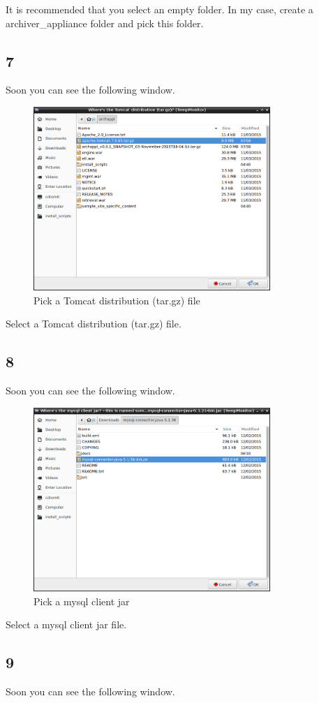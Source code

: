 \documentclass[11pt
  , a4paper
  , article
  , oneside
]{memoir}
\begin{document}
It is recommended that you select an empty folder. In my case, create a archiver\_appliance folder and pick this folder.\\
\subsection{7}
Soon you can see the following window.

\begin{figure}[h!]
	\centering
	\includegraphics[width=0.8\textwidth, height=0.4\textwidth]{./images/2.png}
	\caption{Pick a Tomcat distribution (tar.gz) file}
\end{figure}

Select a Tomcat distribution (tar.gz) file.
\subsection{8}
Soon you can see the following window.

\begin{figure}[h!]
	\centering
	\includegraphics[width=0.8\textwidth, height=0.4\textwidth]{./images/3.png}
	\caption{Pick a mysql client jar}
\end{figure}

Select a mysql client jar file.

\subsection{9}
Soon you can see the following window.
\end{document}
